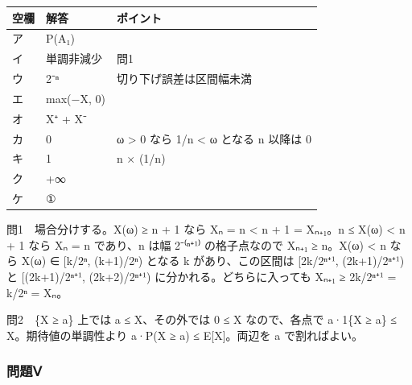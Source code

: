 \documentclass[
  10pt,
  a4paper,
]{article}
\begin{document}
\begin{longtable}[]{@{}lll@{}}
\toprule\noalign{}
空欄 & 解答 & ポイント \\
\midrule\noalign{}
\endhead
\bottomrule\noalign{}
\endlastfoot
ア & P(A{\fallbackfont ₁}) & \\
イ & 単調非減少 & 問1 \\
ウ & 2{\fallbackfont ⁻ⁿ} & 切り下げ誤差は区間幅未満 \\
エ & max(−X, 0) & \\
オ & X{\fallbackfont ⁺} + X{\fallbackfont ⁻} & \\
カ & 0 & ω \textgreater{} 0 なら 1/n \textless{} ω となる n 以降は 0 \\
キ & 1 & n × (1/n) \\
ク & +∞ & \\
ケ & ① & \\
\end{longtable}

問1　場合分けする。X(ω) ≥ n + 1 なら X{\fallbackfont ₙ} = n \textless{}
n + 1 = X{\fallbackfont ₙ₊₁}。n ≤ X(ω) \textless{} n + 1 なら
X{\fallbackfont ₙ} = n であり、n は幅
2{\fallbackfont ⁻⁽ⁿ⁺}¹{\fallbackfont ⁾} の格子点なので
X{\fallbackfont ₙ₊₁} ≥ n。X(ω) \textless{} n なら X(ω) ∈
{[}k/2{\fallbackfont ⁿ}, (k+1)/2{\fallbackfont ⁿ}) となる k
があり、この区間は {[}2k/2{\fallbackfont ⁿ⁺}¹,
(2k+1)/2{\fallbackfont ⁿ⁺}¹) と {[}(2k+1)/2{\fallbackfont ⁿ⁺}¹,
(2k+2)/2{\fallbackfont ⁿ⁺}¹) に分かれる。どちらに入っても
X{\fallbackfont ₙ₊₁} ≥ 2k/2{\fallbackfont ⁿ⁺}¹ = k/2{\fallbackfont ⁿ} =
X{\fallbackfont ₙ}。

問2　\{X ≥ a\} 上では a ≤ X、その外では 0 ≤ X なので、各点で a·1\{X ≥
a\} ≤ X。期待値の単調性より a·P(X ≥ a) ≤ E{[}X{]}。両辺を a
で割ればよい。

\hypertarget{ux554fux984cux2174}{%
\subsubsection{問題Ⅴ}\label{ux554fux984cux2174}}
\end{document}

